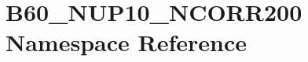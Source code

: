 \hypertarget{namespace_b60___n_u_p10___n_c_o_r_r200}{}\section{B60\+\_\+\+N\+U\+P10\+\_\+\+N\+C\+O\+R\+R200 Namespace Reference}
\label{namespace_b60___n_u_p10___n_c_o_r_r200}
